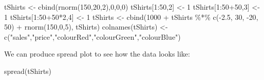 \documentclass[
]{book}
\newenvironment{Shaded}{\begin{snugshade}}{\end{snugshade}}
\newcommand{\DecValTok}[1]{\textcolor[rgb]{0.00,0.00,0.81}{#1}}
\newcommand{\FloatTok}[1]{\textcolor[rgb]{0.00,0.00,0.81}{#1}}
\newcommand{\FunctionTok}[1]{\textcolor[rgb]{0.00,0.00,0.00}{#1}}
\newcommand{\NormalTok}[1]{#1}
\newcommand{\OtherTok}[1]{\textcolor[rgb]{0.56,0.35,0.01}{#1}}
\newcommand{\SpecialCharTok}[1]{\textcolor[rgb]{0.00,0.00,0.00}{#1}}
\newcommand{\StringTok}[1]{\textcolor[rgb]{0.31,0.60,0.02}{#1}}
\theoremstyle{definition}
\theoremstyle{definition}
\theoremstyle{definition}
\theoremstyle{definition}
\theoremstyle{remark}
\begin{document}
\begin{Shaded}
\begin{Highlighting}[]
\NormalTok{tShirts }\OtherTok{\textless{}{-}} \FunctionTok{cbind}\NormalTok{(}\FunctionTok{rnorm}\NormalTok{(}\DecValTok{150}\NormalTok{,}\DecValTok{20}\NormalTok{,}\DecValTok{2}\NormalTok{),}\DecValTok{0}\NormalTok{,}\DecValTok{0}\NormalTok{,}\DecValTok{0}\NormalTok{)}
\NormalTok{tShirts[}\DecValTok{1}\SpecialCharTok{:}\DecValTok{50}\NormalTok{,}\DecValTok{2}\NormalTok{] }\OtherTok{\textless{}{-}} \DecValTok{1}
\NormalTok{tShirts[}\DecValTok{1}\SpecialCharTok{:}\DecValTok{50}\SpecialCharTok{+}\DecValTok{50}\NormalTok{,}\DecValTok{3}\NormalTok{] }\OtherTok{\textless{}{-}} \DecValTok{1}
\NormalTok{tShirts[}\DecValTok{1}\SpecialCharTok{:}\DecValTok{50}\SpecialCharTok{+}\DecValTok{50}\SpecialCharTok{*}\DecValTok{2}\NormalTok{,}\DecValTok{4}\NormalTok{] }\OtherTok{\textless{}{-}} \DecValTok{1}
\NormalTok{tShirts }\OtherTok{\textless{}{-}} \FunctionTok{cbind}\NormalTok{(}\DecValTok{1000} \SpecialCharTok{+}\NormalTok{ tShirts }\SpecialCharTok{\%*\%} \FunctionTok{c}\NormalTok{(}\SpecialCharTok{{-}}\FloatTok{2.5}\NormalTok{, }\DecValTok{30}\NormalTok{, }\SpecialCharTok{{-}}\DecValTok{20}\NormalTok{, }\DecValTok{50}\NormalTok{) }\SpecialCharTok{+} \FunctionTok{rnorm}\NormalTok{(}\DecValTok{150}\NormalTok{,}\DecValTok{0}\NormalTok{,}\DecValTok{5}\NormalTok{), tShirts)}
\FunctionTok{colnames}\NormalTok{(tShirts) }\OtherTok{\textless{}{-}} \FunctionTok{c}\NormalTok{(}\StringTok{"sales"}\NormalTok{,}\StringTok{"price"}\NormalTok{,}\StringTok{"colourRed"}\NormalTok{,}\StringTok{"colourGreen"}\NormalTok{,}\StringTok{"colourBlue"}\NormalTok{)}
\end{Highlighting}
\end{Shaded}

We can produce spread plot to see how the data looks like:

\begin{Shaded}
\begin{Highlighting}[]
\FunctionTok{spread}\NormalTok{(tShirts)}
\end{Highlighting}
\end{Shaded}
\end{document}
